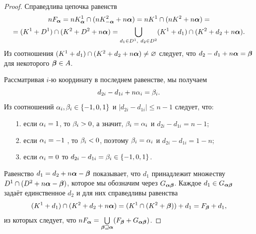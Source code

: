 \begin{proof}
Справедлива цепочка равенств
\begin{multline}\label{line}
nF_{\bm{\alpha}}=nK^1_{\bm{\alpha}}\cap (nK^2_{-{\bm{\alpha}}}+n{\bm{\alpha}})=nK^1\cap(nK^2+n{\bm{\alpha}})=\\
=(K^1+D^1)\cap(K^2+D^2+n{\bm{\alpha}})=
\bigcup\limits_{d_1\in D^1,\ d_2\in D^2}(K^1+d_1)\cap (K^2+d_2+n{\bm{\alpha}}).
\end{multline}
Из соотношения $(K^1+d_1)\cap (K^2+d_2+n{\bm{\alpha}})\neq\varnothing$ следует, что $d_2-d_1+n{\bm{\alpha}}={\bm{\beta}}$ для некоторого ${\bm{\beta}}\in A$.

Рассматривая $i$-ю координату в последнем равенстве, мы получаем
$$d_{2i}-d_{1i}+n\alpha_i=\beta_i.$$ 
Из соотношений $\alpha_i,\beta_i\in\{-1,0,1\}$ и $|d_{2i}-d_{1i}|\le n-1$ следует, что: \medskip
\begin{itemize}[nolistsep]
 \item[1.] если $\alpha_i=1$, то $\beta_i>0$, а значит, $\beta_i=\alpha_i$ и $d_{2i}-d_{1i}=n-1$;
 \item[2.] если $\alpha_i=-1$ , то $\beta_i<0$, поэтому $\beta_i=\alpha_i$ и $d_{2i}-d_{1i}=1-n$;
 \item[3.] если $\alpha_i=0$ то $d_{2i}-d_{1i}=\beta_i\in\{-1,0,1\}$.
\end{itemize} 
\medskip

Равенство $d_1=d_2+n{\bm{\alpha}}-{\bm{\beta}}$ показывает, что $d_1$ принадлежит множеству $D^1\cap(D^2+n{\bm{\alpha}}-{\bm{\beta}})$, которое мы обозначим через $G_{{\bm{\alpha}}{\bm{\beta}}}$.
Каждое $d_1\in G_{{\bm{\alpha}}{\bm{\beta}}}$ задаёт единственное $d_2$ и для них справедливы равенства 
$$(K^1+d_1)\cap (K^2+d_2+n{\bm{\alpha}})= (K^1\cap(K^2+{\bm{\beta}}))+d_1= F_{\bm{\beta}}+d_1,$$ 
из которых следует, что $nF_{\bm{\alpha}}= \bigcup\limits_{{\bm{\beta}}\sqsupseteq{\bm{\alpha}}} (F_{\bm{\beta}}+G_{{\bm{\alpha}}{\bm{\beta}}})$.
\end{proof}

% 
% 

